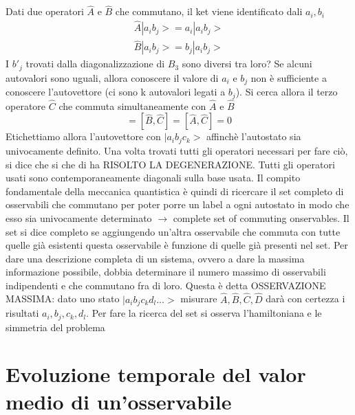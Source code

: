 \documentclass[a4paper,11pt]{report}
\theoremstyle{remark}
\theoremstyle{definition}
\begin{document}
Dati due operatori $\hat{A}$ e $\hat{B}$ che commutano, il ket viene identificato dali $a_i,b_i$
\begin{align*}
    \hat{A}|a_ib_j> = a_i |a_ib_j> \\
    \hat{B}|a_ib_j> = b_j |a_ib_j>
\end{align*}
I $b'_j$ trovati dalla diagonalizzazione di $B_3$ sono diversi tra loro? Se alcuni autovalori sono uguali, allora conoscere il valore di $a_i$ e $b_j$ non è sufficiente a conoscere l'autovettore (ci sono k autovalori legati a $b_j$). Si cerca allora il terzo operatore $\hat{C}$ che commuta simultaneamente con $\hat{A}$ e $\hat{B}$
\begin{equation*}
    [\hat{A},\hat{B}] = [\hat{B}, \hat{C}] = [\hat{A}, \hat{C}] = 0
\end{equation*}
Etichettiamo allora l'autovettore con $|a_ib_jc_k>$ affinchè l'autostato sia univocamente definito. Una volta trovati tutti gli operatori necessari per fare ciò, si dice che si che di ha RISOLTO LA DEGENERAZIONE. Tutti gli operatori usati sono contemporaneamente diagonali sulla base usata. \newline
Il compito fondamentale della meccanica quantistica è quindi di ricercare il set completo di osservabili che commutano per poter porre un label a ogni autostato in modo che esso sia univocamente determinato $\rightarrow$ complete set of commuting onservables. Il set si dice completo se aggiungendo un'altra osservabile che commuta con tutte quelle già esistenti questa osservabile è funzione di quelle già presenti nel set. \newline
Per dare una descrizione completa di un sistema, ovvero a dare la massima informazione possibile, dobbia determinare il numero massimo di osservabili indipendenti e che commutano fra di loro. Questa è detta OSSERVAZIONE MASSIMA: dato uno stato $|a_ib_jc_kd_l \dots>$ misurare $\hat{A},\hat{B},\hat{C},\hat{D}$ darà con certezza i risultati $a_i,b_j,c_k,d_l$. Per fare la ricerca del set si osserva l'hamiltoniana e le simmetria del problema

\chapter{Evoluzione temporale del valor medio di un'osservabile}
\end{document}
